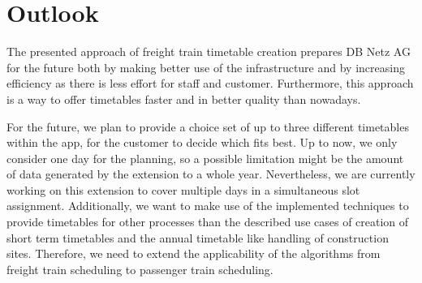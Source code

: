 \section{Outlook}
\label{chap:outlook}
The presented approach of freight train timetable creation prepares DB Netz AG for the future both by making better use of the infrastructure and by increasing efficiency as there is less effort for staff and customer. Furthermore, this approach is a way to offer timetables faster and in better quality than nowadays.

For the future, we plan to provide a choice set of up to three different timetables within the app, for the customer to decide which fits best. Up to now, we only consider one day for the planning, so a possible limitation might be the amount of data generated by the extension to a whole year. Nevertheless, we are currently working on this extension to cover multiple days in a simultaneous slot assignment.
Additionally, we want to make use of the implemented techniques to provide timetables for other processes than the described use cases of creation of short term timetables and the annual timetable like handling of construction sites. Therefore, we need to extend the applicability of the algorithms from freight train scheduling to passenger train scheduling.